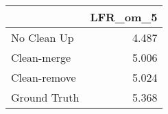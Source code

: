 \begin{tabular}{lr}
\toprule
{} & LFR_om_5 \\
\midrule
No Clean Up  &    4.487 \\
Clean-merge  &    5.006 \\
Clean-remove &    5.024 \\
Ground Truth &    5.368 \\
\bottomrule
\end{tabular}
